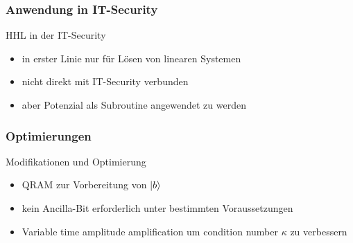 \begin{frame}
    \frametitle{Anwendung in IT-Security}


    HHL in der IT-Security
    \begin{itemize}
        \item in erster Linie nur für Lösen von linearen Systemen
        \item nicht direkt mit IT-Security verbunden
        \item aber Potenzial als Subroutine angewendet zu werden
    \end{itemize}

    \hfil


\end{frame}

\begin{frame}
    \frametitle{Optimierungen}

    Modifikationen und Optimierung
    \begin{itemize}[<+->]
        \item QRAM zur Vorbereitung von $\ket{b}$
        \item kein Ancilla-Bit erforderlich unter bestimmten Voraussetzungen 
        \item Variable time amplitude amplification um condition number $\kappa$ zu verbessern
    \end{itemize}
    
\end{frame}

